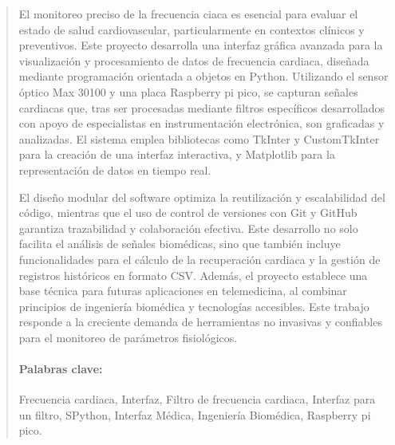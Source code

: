 \documentclass[16pt]{article}
\begin{document}
\begin{abstract}
	El monitoreo preciso de la frecuencia ciaca es esencial para evaluar el estado de salud cardiovascular, particularmente en contextos clínicos y preventivos. Este proyecto desarrolla una interfaz gráfica avanzada para la visualización y procesamiento de datos de frecuencia cardiaca, diseñada mediante programación orientada a objetos en Python. Utilizando el sensor óptico Max 30100 y una placa Raspberry pi pico, se capturan señales cardiacas que, tras ser procesadas mediante filtros específicos desarrollados con apoyo de especialistas en instrumentación electrónica, son graficadas y analizadas. El sistema emplea bibliotecas como TkInter y CustomTkInter para la creación de una interfaz interactiva, y Matplotlib para la representación de datos en tiempo real.
	
	El diseño modular del software optimiza la reutilización y escalabilidad del código, mientras que el uso de control de versiones con Git y GitHub garantiza trazabilidad y colaboración efectiva. Este desarrollo no solo facilita el análisis de señales biomédicas, sino que también incluye funcionalidades para el cálculo de la recuperación cardiaca y la gestión de registros históricos en formato CSV. Además, el proyecto establece una base técnica para futuras aplicaciones en telemedicina, al combinar principios de ingeniería biomédica y tecnologías accesibles. Este trabajo responde a la creciente demanda de herramientas no invasivas y confiables para el monitoreo de parámetros fisiológicos.
	
	\paragraph{Palabras clave:}
	Frecuencia cardiaca, Interfaz, Filtro de frecuencia cardiaca, Interfaz para un filtro, SPython, Interfaz Médica, Ingeniería Biomédica, Raspberry pi pico.
	
	
\end{abstract}
\end{document}
